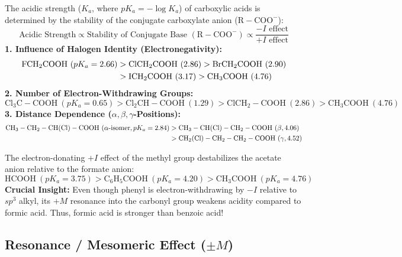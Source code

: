 \documentclass[10pt,a4paper]{article}
\begin{document}
\begin{usecasebox}
The acidic strength ($K_a$, where $pK_a = -\log K_a$) of carboxylic acids is determined by the stability of the conjugate carboxylate anion ($\mathrm{R-COO^-}$):
\begin{equation}
  \text{Acidic Strength} \propto \text{Stability of Conjugate Base } (\mathrm{R-COO^-}) \propto \frac{-I\text{ effect}}{+I\text{ effect}}
\end{equation}
\textbf{1. Influence of Halogen Identity (Electronegativity):}
\begin{align}
  \mathrm{FCH_2COOH} \ (pK_a = 2.66) &> \mathrm{ClCH_2COOH} \ (2.86) > \mathrm{BrCH_2COOH} \ (2.90) \notag \\
  &> \mathrm{ICH_2COOH} \ (3.17) > \mathrm{CH_3COOH} \ (4.76)
\end{align}
\textbf{2. Number of Electron-Withdrawing Groups:}
\begin{equation}
  \mathrm{Cl_3C-COOH} \ (pK_a = 0.65) > \mathrm{Cl_2CH-COOH} \ (1.29) > \mathrm{ClCH_2-COOH} \ (2.86) > \mathrm{CH_3COOH} \ (4.76)
\end{equation}
\textbf{3. Distance Dependence ($\alpha, \beta, \gamma$-Positions):}
\begin{align}
  \mathrm{CH_3-CH_2-CH(Cl)-COOH} \ (\alpha\text{-isomer}, pK_a = 2.84) &> \mathrm{CH_3-CH(Cl)-CH_2-COOH} \ (\beta, 4.06) \notag \\
  &> \mathrm{CH_2(Cl)-CH_2-CH_2-COOH} \ (\gamma, 4.52)
\end{align}
\end{usecasebox}

\begin{ncertbox}
The electron-donating $+I$ effect of the methyl group destabilizes the acetate anion relative to the formate anion:
\begin{equation}
  \mathrm{HCOOH} \ (pK_a = 3.75) > \mathrm{C_6H_5COOH} \ (pK_a = 4.20) > \mathrm{CH_3COOH} \ (pK_a = 4.76)
\end{equation}
\textbf{Crucial Insight:} Even though phenyl is electron-withdrawing by $-I$ relative to $sp^3$ alkyl, its $+M$ resonance into the carbonyl group weakens acidity compared to formic acid. Thus, formic acid is stronger than benzoic acid!
\end{ncertbox}

\subsection{Resonance / Mesomeric Effect (\texorpdfstring{$\pm M$}{+-M})}
\end{document}
